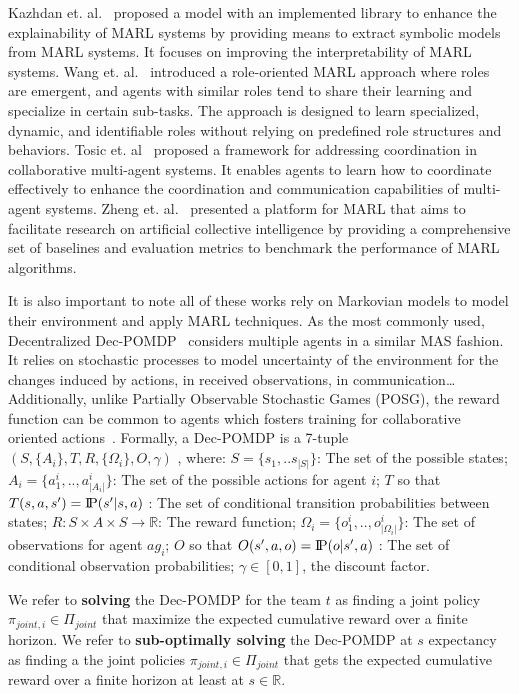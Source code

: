 \documentclass[runningheads]{llncs}
\newcommand{\probP}{\text{I\kern-0.15em P}}
\begin{document}
Kazhdan et. al.~\cite{Kazhdan2020} proposed a model with an implemented library to enhance the explainability of MARL systems by providing means to extract symbolic models from MARL systems. It focuses on improving the interpretability of MARL systems.
Wang et. al.~\cite{Wang2020} introduced a role-oriented MARL approach where roles are emergent, and agents with similar roles tend to share their learning and specialize in certain sub-tasks. The approach is designed to learn specialized, dynamic, and identifiable roles without relying on predefined role structures and behaviors.
Tosic et. al~\cite{Tosic2010} proposed a framework for addressing coordination in collaborative multi-agent systems. It enables agents to learn how to coordinate effectively to enhance the coordination and communication capabilities of multi-agent systems.
Zheng et. al.~\cite{Zheng2018} presented a platform for MARL that aims to facilitate research on artificial collective intelligence by providing a comprehensive set of baselines and evaluation metrics to benchmark the performance of MARL algorithms.

It is also important to note all of these works rely on Markovian models to model their environment and apply MARL techniques. As the most commonly used, Decentralized Dec-POMDP~\cite{Oliehoek2016} considers multiple agents in a similar MAS fashion. It relies on stochastic processes to model uncertainty of the environment for the changes induced by actions, in received observations, in communication\dots Additionally, unlike Partially Observable Stochastic Games (POSG), the reward function can be common to agents which fosters training for collaborative oriented actions~\cite{Beynier2013}. Formally, a Dec-POMDP is a 7-tuple $(S,\{A_i\},T,R,\{\Omega_i\},O,\gamma)$ , where: $S = \{s_1, ..s_{|S|}\}$: The set of the possible states; $A_{i} = \{a_{1}^{i},..,a_{|A_{i}|}^{i}\}$: The set of the possible actions for agent $i$; $T$ so that $T(s,a,s') = \probP{(s'|s,a)}$ : The set of conditional transition probabilities between states; $R: S \times A \times S \rightarrow \mathbb{R}$: The reward function; $\Omega_{i} = \{o_{1}^{i},..,o_{|\Omega_{i}|}^{i}\}$: The set of observations for agent $ag_i$; $O$ so that $O(s',a,o) = \probP{(o|s',a)}$ : The set of conditional observation probabilities; $\gamma \in [0,1]$, the discount factor.

We refer to \textbf{solving} the Dec-POMDP for the team $t$ as finding a joint policy $\pi_{joint,i} \in \Pi_{joint}$ that maximize the expected cumulative reward over a finite horizon.
We refer to \textbf{sub-optimally solving} the Dec-POMDP at $s$ expectancy as finding a the joint policies $\pi_{joint,i} \in \Pi_{joint}$ that gets the expected cumulative reward over a finite horizon at least at $s \in \mathbb{R}$.
\end{document}
